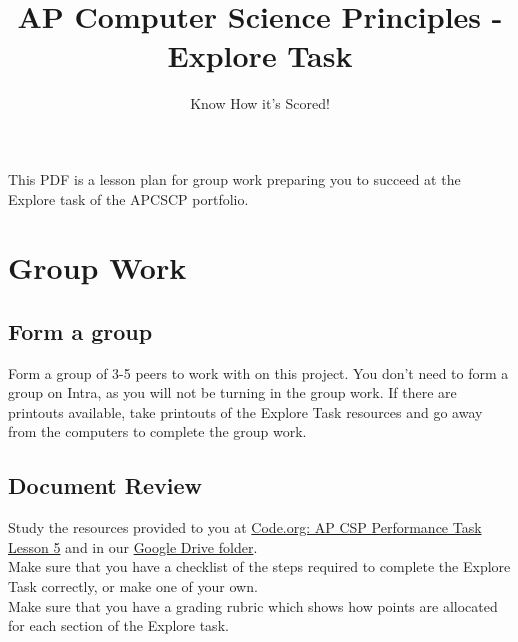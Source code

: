 \documentclass{42-en}
\begin{document}
\title{AP Computer Science Principles - Explore Task}
\subtitle{Know How it's Scored!}


\summary
{
This PDF is a lesson plan for group work preparing you to succeed at the Explore task of the APCSCP portfolio.
}

\maketitle

\tableofcontents


\chapter{Group Work}

\section{Form a group}

Form a group of 3-5 peers to work with on this project. You don't need to form a group on Intra, as you will not be turning in the group work. If there are printouts available, take printouts of the Explore Task resources and go away from the computers to complete the group work.

\section{Document Review}

Study the resources provided to you at \href{https://curriculum.code.org/csp/csp-ap/5}{Code.org: AP CSP Performance Task Lesson 5} and in our \href{https://drive.google.com/open?id=0B8tSiu_FFz0IdzJSWFU2VE1lR3M}{Google Drive folder}.\\

Make sure that you have a checklist of the steps required to complete the Explore Task correctly, or make one of your own.\\

Make sure that you have a grading rubric which shows how points are allocated for each section of the Explore task.\\
\end{document}
